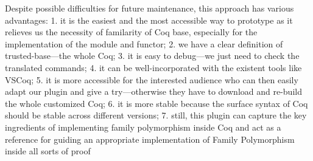 Despite possible difficulties for future maintenance, this approach has
various advantages: 1. it is the easiest and the most accessible way to
prototype as it relieves us the necessity of familarity of Coq base,
especially for the implementation of the module and functor; 2. we have
a clear definition of trusted-base---the whole Coq; 3. it is easy to
debug---we just need to check the translated commands; 4. it can be
well-incorporated with the existent tools like VSCoq; 5. it is more
accessible for the interested audience who can then easily adapt our
plugin and give a try---otherwise they have to download and re-build the
whole customized Coq; 6. it is more stable because the surface syntax of
Coq should be stable across different versions; 7. still, this plugin
can capture the key ingredients of implementing family polymorphism
inside Coq and act as a reference for guiding an appropriate
implementation of Family Polymorphism inside all sorts of proof

